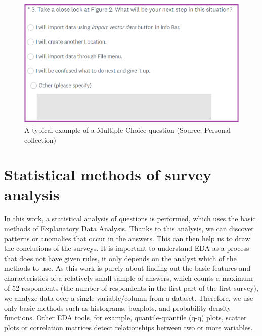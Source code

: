 \documentclass[a4paper,10pt,twoside]{article}
\begin{document}
\vspace{0.3cm}
\begin{figure}[hbt!] 
\begin{center}
\includegraphics[width=14cm]{../pictures/multiple_choice_question.png} 
\caption[A typical example of a Multiple Choice question]{A typical example of a Multiple Choice question (Source: Personal collection)}
\label{fig:multiple_choice_question}
\end{center}
\end{figure}

\newpage
\vspace*{-1cm}
\section{Statistical methods of survey analysis}
\label{sec:qstat}

\noindent In this work, a statistical analysis of questions is performed, which uses the basic methods of Explanatory Data Analysis. Thanks to this analysis, we can discover patterns or anomalies that occur in the answers. This can then help us to draw the conclusions of the surveys. It is important to understand EDA as a process that does not have given rules, it only depends on the analyst which of the methods to use. As this work is purely about finding out the basic features and characteristics of a relatively small sample of answers, which counts a maximum of 52 respondents (the number of respondents in the first part of the first survey), we analyze data over a single variable/column from a dataset. Therefore, we use only basic methods such as histograms, boxplots, and probability density functions. Other EDA tools, for example, quantile-quantile (q-q) plots, scatter plots or correlation matrices detect relationships between two or more variables.
\end{document}
